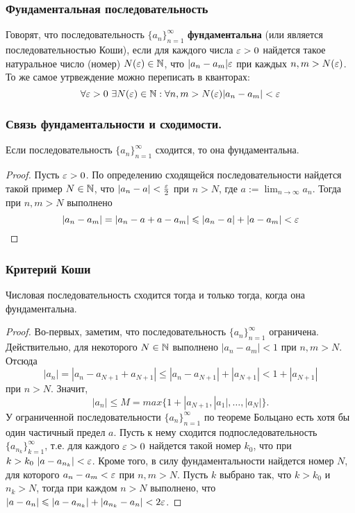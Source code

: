 \documentclass[12pt, a4paper]{article}
\begin{document}
    \subsubsection{Фундаментальная последовательность}
    Говорят, что последовательность $\{a_n\}^{\infty}_{n=1}$ \textbf{фундаментальна} (или является последовательностью Коши), если для каждого числа $\varepsilon > 0$ найдется такое натуральное число (номер) $N(\varepsilon) \in \mathbb{N}$, что $|a_n - a_m| \varepsilon$ при каждых $n, m > N(\varepsilon)$. То же самое утрвеждение можно переписать в кванторах: 
    \begin{equation*}
        \forall \varepsilon > 0 \ \exists N(\varepsilon) \in \mathbb{N} : \forall n, m > N(\varepsilon) |a_n - a_m| < \varepsilon
    \end{equation*}
    \subsubsection{Связь фундаментальности и сходимости.}
    Если последовательность $\{a_n\}^{\infty}_{n=1}$ сходится, то она фундаментальна.
    \begin{proof}
    Пусть $\varepsilon > 0$. По определению сходящейся последовательности найдется такой пример $N \in \mathbb{N}$, что $|a_n - a| < \frac{\varepsilon}{2}$ при $n > N$, где $a := \lim_{n \to \infty} a_n$. Тогда при $n, m > N$ выполнено
    \begin{equation}
        |a_n - a_m| = |a_n - a + a - a_m| \leqslant |a_n - a| + |a - a_m| < \varepsilon
    \end{equation}
    \end{proof}
    \subsubsection{Критерий Коши}
    Числовая последовательность сходится тогда и только тогда, когда она фундаментальна.
    \begin{proof}
    Во-первых, заметим, что последовательность $\{a_n\}^{\infty}_{n=1}$ ограничена. Действительно, для некоторого $N \in \mathbb{N}$ выполнено $|a_n - a_m| < 1$ при $n, m > N$. Отсюда
    \begin{equation*}
        |a_n| = |a_n - a_{N + 1} + a_{N + 1}| \leq |a_n - a_{N+1}| + |a_{N+1}| < 1 + |a_{N + 1}|
    \end{equation*}
    при $n > N$. Значит,
    \begin{equation*}
        |a_n| \leq M = max \{1 + |a_{N+1}, |a_1|, \dots, |a_N|\}.
    \end{equation*}
    У ограниченной последовательности $\{a_n\}^{\infty}_{n=1}$ по теореме Больцано есть хотя бы один частичный предел $a$. Пусть к нему сходится подпоследовательность $\{a_{n_k}\}_{k=1}^{\infty}$, т.е. для каждого $\varepsilon > 0$ найдется такой номер $k_0$, что при $k > k_0 \ |a - a_{n_k}| < \varepsilon$. Кроме того, в силу фундаментальности найдется номер $N$, для которого $a_n - a_m < \varepsilon$ при $n, m > N$. Пусть $k$ выбрано так, что $k > k_0$ и $n_k > N$, тогда при каждом $n > N$ выполнено, что $|a - a_n| \leqslant |a - a_{n_k}| + |a_{n_k} - a_n| < 2 \varepsilon$.
    \end{proof}
\end{document}
